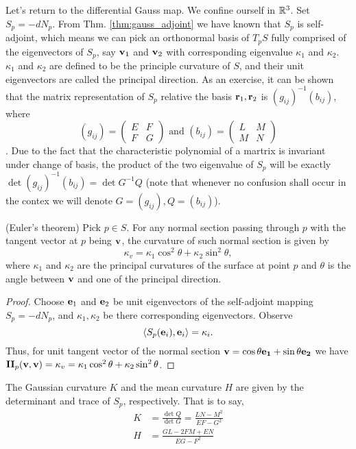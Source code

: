 Let's return to the differential Gauss map. We confine ourself in $\mathbb{R}^3$. Set $S_p = -dN_p$. From Thm. \ref{thm:gauss_adjoint} we have known that $S_p$ is self-adjoint, which means we can pick an orthonormal basis of $T_pS$ fully comprised of the eigenvectors of $S_p$, say $\mathbf{v}_1$ and $\mathbf{v}_2$ with corresponding eigenvalue $\kappa_1$ and $\kappa_2$. $\kappa_1$ and $\kappa_2$ are defined to be the principle curvature of $S$, and their unit eigenvectors are called the principal direction. As an exercise, it can be shown that the matrix representation of $S_p$ relative the basis $\mathbf{r}_1, \mathbf{r}_2$ is $(g_{ij})^{-1}(b_{ij})$, where \[ (g_{ij}) = \begin{pmatrix}
E & F \\
F & G
\end{pmatrix} \text{ and }
(b_{ij}) = \begin{pmatrix}
L & M \\
M & N
\end{pmatrix}\]. Due to the fact that the characteristic polynomial of a martrix is invariant under change of basis, the product of the two eigenvalue of $S_p$ will be exactly $\det(g_{ij})^{-1}(b_{ij}) = \det G^{-1}Q$ (note that whenever no confusion shall occur in the contex we will denote $G = (g_{ij}), Q = (b_{ij})$).

\begin{theorem}
	(Euler's theorem) Pick $p \in S$. For any normal section passing through $p$ with the tangent vector at $p$ being $\mathbf{v}$, the curvature of such normal section is given by \[ \kappa_{v} = \kappa_{1}\cos^2\theta + \kappa_2\sin^2\theta,\] where $\kappa_1$ and $\kappa_2$ are the principal curvatures of the surface at point $p$ and $\theta$ is the angle between $\mathbf{v}$ and one of the principal direction.
\end{theorem}

\begin{proof}
	Choose $\mathbf{e}_{1}$ and $\mathbf{e}_2$ be unit eigenvectors of the self-adjoint mapping $S_p = -dN_p$, and $\kappa_1, \kappa_2$ be there corresponding eigenvectors. Observe \[\left< S_p(\mathbf{e}_i), \mathbf{e}_i \right> = \kappa_i.\] Thus, for unit tangent vector of the normal section $\mathbf{v} = \cos\theta \mathbf{e_1} + \sin\theta \mathbf{e_2} $ we have $\mathbf{II}_{p}(\mathbf{v}, \mathbf{v}) = \kappa_{v} = \kappa_1\cos^2\theta + \kappa_2\sin^2\theta$.
\end{proof}

\begin{definition}
	The Gaussian curvature $K$ and the mean curvature $H$ are given by the determinant and trace of $S_p$, respectively. That is to say,
	\begin{align}
		K &= \frac{\det Q}{\det G} = \frac{LN - M^2}{EF - G^2}\\
		H &= \frac{GL - 2FM + EN}{EG - F^2}\\
	\end{align}
\end{definition}







